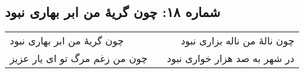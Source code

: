 \begin{center}
\section*{شماره ۱۸: چون گریۀ من ابر بهاری نبود}
\label{sec:018}
\begin{longtable}{l p{0.5cm} r}
چون گریهٔ من ابر بهاری نبود
&&
چون نالهٔ من ناله بزاری نبود
\\
چون من زغم مرگ تو ای یار عزیز
&&
در شهر به صد هزار خواری نبود
\\
\end{longtable}
\end{center}
